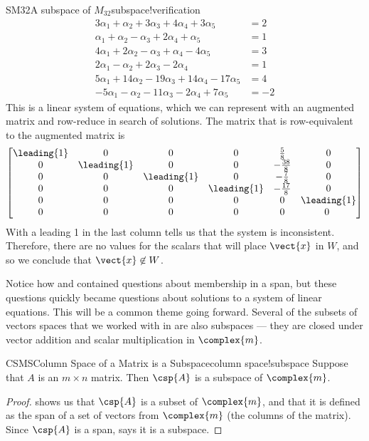 \begin{example}{SM32}{A subspace of $M_{32}$}{subspace!verification}
%
\begin{align*}
3\alpha_1 +\alpha_2 +3\alpha_3 +4\alpha_4 +3\alpha_5& =2\\
\alpha_1 +\alpha_2 -\alpha_3 +2\alpha_4 +\alpha_5& =1\\
4\alpha_1 +2\alpha_2 -\alpha_3 +\alpha_4 -4\alpha_5& =3\\
2\alpha_1 -\alpha_2 +2\alpha_3 -2\alpha_4 & =1\\
5\alpha_1 +14\alpha_2 -19\alpha_3 +14\alpha_4 -17\alpha_5& =4\\
-5\alpha_1 -\alpha_2 -11\alpha_3 -2\alpha_4 +7\alpha_5&=-2
\end{align*}
%
This is a linear system of equations, which we can represent with an augmented matrix and row-reduce in search of solutions.  The matrix that is row-equivalent to the augmented matrix is
%
\begin{equation*}
\begin{bmatrix}
\leading{1} & 0 & 0 & 0 & \frac{5}{8} & 0\\
0 & \leading{1} & 0 & 0 & -\frac{38}{8} & 0\\
0 & 0 & \leading{1} & 0 & -\frac{7}{8} & 0\\
0 & 0 & 0 & \leading{1} & -\frac{17}{8} & 0\\
0 & 0 & 0 & 0 & 0 & \leading{1}\\
0 & 0 & 0 & 0 & 0 & 0\
\end{bmatrix}
\end{equation*}
%
With a leading 1 in the last column  tells us that the system is inconsistent.  Therefore, there are no values for the scalars that will place $\vect{x}$ in $W$, and so we conclude that $\vect{x}\not\in W$.
\end{example}
%
Notice how   and  contained questions about membership in a span, but these questions quickly became questions about solutions to a system of linear equations.  This will be a common theme going forward.
%
%
Several of the subsets of vectors spaces that we worked with in  are also subspaces --- they are closed under vector addition and scalar multiplication in $\complex{m}$.
%
\begin{theorem}{CSMS}{Column Space of a Matrix is a Subspace}{column space!subspace}
Suppose that $A$ is an $m\times n$ matrix.  Then $\csp{A}$ is a subspace of $\complex{m}$.
\end{theorem}
%
\begin{proof}
 shows us that $\csp{A}$ is a subset of $\complex{m}$, and that it is defined as the span of a set of vectors from $\complex{m}$ (the columns of the matrix).  Since $\csp{A}$ is a span,  says it is a subspace.
\end{proof}

